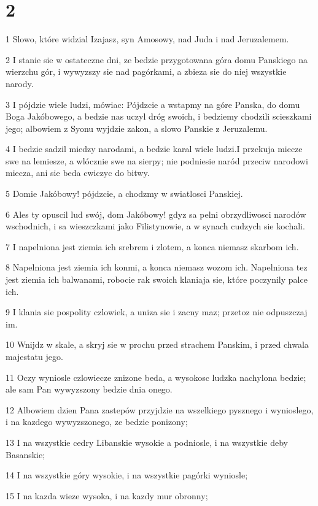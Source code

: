 \chapter{2}

\par 1 Slowo, które widzial Izajasz, syn Amosowy, nad Juda i nad Jeruzalemem.
\par 2 I stanie sie w ostateczne dni, ze bedzie przygotowana góra domu Panskiego na wierzchu gór, i wywyzszy sie nad pagórkami, a zbieza sie do niej wszystkie narody.
\par 3 I pójdzie wiele ludzi, mówiac: Pójdzcie a wstapmy na góre Panska, do domu Boga Jakóbowego, a bedzie nas uczyl dróg swoich, i bedziemy chodzili scieszkami jego; albowiem z Syonu wyjdzie zakon, a slowo Panskie z Jeruzalemu.
\par 4 I bedzie sadzil miedzy narodami, a bedzie karal wiele ludzi.I przekuja miecze swe na lemiesze, a wlócznie swe na sierpy; nie podniesie naród przeciw narodowi miecza, ani sie beda cwiczyc do bitwy.
\par 5 Domie Jakóbowy! pójdzcie, a chodzmy w swiatlosci Panskiej.
\par 6 Ales ty opuscil lud swój, dom Jakóbowy! gdyz sa pelni obrzydliwosci narodów wschodnich, i sa wieszczkami jako Filistynowie, a w synach cudzych sie kochali.
\par 7 I napelniona jest ziemia ich srebrem i zlotem, a konca niemasz skarbom ich.
\par 8 Napelniona jest ziemia ich konmi, a konca niemasz wozom ich. Napelniona tez jest ziemia ich balwanami, robocie rak swoich klaniaja sie, które poczynily palce ich.
\par 9 I klania sie pospolity czlowiek, a uniza sie i zacny maz; przetoz nie odpuszczaj im.
\par 10 Wnijdz w skale, a skryj sie w prochu przed strachem Panskim, i przed chwala majestatu jego.
\par 11 Oczy wyniosle czlowiecze znizone beda, a wysokosc ludzka nachylona bedzie; ale sam Pan wywyzszony bedzie dnia onego.
\par 12 Albowiem dzien Pana zastepów przyjdzie na wszelkiego pysznego i wynioslego, i na kazdego wywyzszonego, ze bedzie ponizony;
\par 13 I na wszystkie cedry Libanskie wysokie a podniosle, i na wszystkie deby Basanskie;
\par 14 I na wszystkie góry wysokie, i na wszystkie pagórki wyniosle;
\par 15 I na kazda wieze wysoka, i na kazdy mur obronny;
